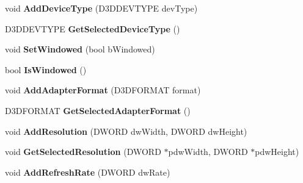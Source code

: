 \begin{DoxyCompactItemize}
\item 
\hypertarget{class_c_d3_d_settings_dlg_aa5015f5a50011606b49984cd24baa347}{void {\bfseries Add\+Device\+Type} (D3\+D\+D\+E\+V\+T\+Y\+P\+E dev\+Type)}\label{class_c_d3_d_settings_dlg_aa5015f5a50011606b49984cd24baa347}

\item 
\hypertarget{class_c_d3_d_settings_dlg_a1a4e9165151846c6fb735f3cd0add737}{D3\+D\+D\+E\+V\+T\+Y\+P\+E {\bfseries Get\+Selected\+Device\+Type} ()}\label{class_c_d3_d_settings_dlg_a1a4e9165151846c6fb735f3cd0add737}

\item 
\hypertarget{class_c_d3_d_settings_dlg_a1a8187c3c56b9998c25d7fb4fc1c5ab8}{void {\bfseries Set\+Windowed} (bool b\+Windowed)}\label{class_c_d3_d_settings_dlg_a1a8187c3c56b9998c25d7fb4fc1c5ab8}

\item 
\hypertarget{class_c_d3_d_settings_dlg_a3788a01ff4742e458ba3d117d2bfdde3}{bool {\bfseries Is\+Windowed} ()}\label{class_c_d3_d_settings_dlg_a3788a01ff4742e458ba3d117d2bfdde3}

\item 
\hypertarget{class_c_d3_d_settings_dlg_a980ec0d429e0c796284f9b1874510a14}{void {\bfseries Add\+Adapter\+Format} (D3\+D\+F\+O\+R\+M\+A\+T format)}\label{class_c_d3_d_settings_dlg_a980ec0d429e0c796284f9b1874510a14}

\item 
\hypertarget{class_c_d3_d_settings_dlg_a0a6307d23bd4277db326e440106b02fa}{D3\+D\+F\+O\+R\+M\+A\+T {\bfseries Get\+Selected\+Adapter\+Format} ()}\label{class_c_d3_d_settings_dlg_a0a6307d23bd4277db326e440106b02fa}

\item 
\hypertarget{class_c_d3_d_settings_dlg_ae3b20d440c76b3cb09de3f2e1f3fd4a3}{void {\bfseries Add\+Resolution} (D\+W\+O\+R\+D dw\+Width, D\+W\+O\+R\+D dw\+Height)}\label{class_c_d3_d_settings_dlg_ae3b20d440c76b3cb09de3f2e1f3fd4a3}

\item 
\hypertarget{class_c_d3_d_settings_dlg_a64deb789f38a469aaae9b24a98c1ba89}{void {\bfseries Get\+Selected\+Resolution} (D\+W\+O\+R\+D $\ast$pdw\+Width, D\+W\+O\+R\+D $\ast$pdw\+Height)}\label{class_c_d3_d_settings_dlg_a64deb789f38a469aaae9b24a98c1ba89}

\item 
\hypertarget{class_c_d3_d_settings_dlg_a1d0d0f62187b4f88256a866c22755647}{void {\bfseries Add\+Refresh\+Rate} (D\+W\+O\+R\+D dw\+Rate)}\label{class_c_d3_d_settings_dlg_a1d0d0f62187b4f88256a866c22755647}


\end{DoxyCompactItemize}
